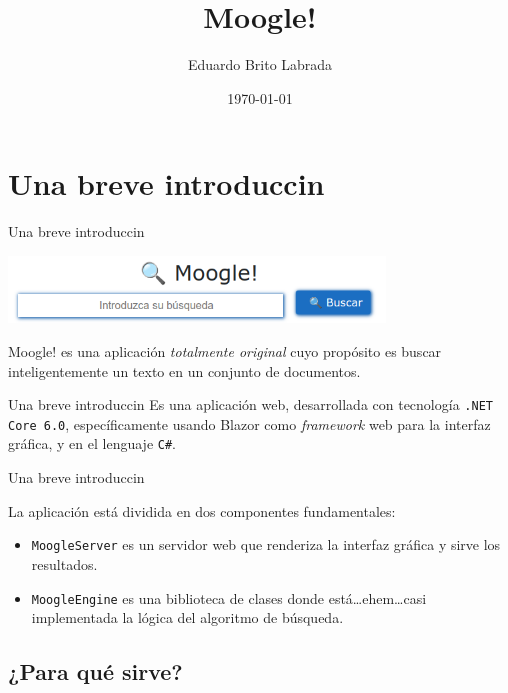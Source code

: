 \documentclass{beamer}
\title[Moogle!]{\LARGE Moogle!}
\author{Eduardo Brito Labrada}
\institute[Universidad de La Habana]
{
  Facultad de Matem\'atica y Computacin
}
\date{\today}
\begin{document}
\begin{frame}
  \maketitle
\end{frame}

\section{Una breve introduccin}

\begin{frame}{Una breve introduccin}
  \begin{center}
    \includegraphics[width=10cm]{images/moogle.png}
  \end{center}

  Moogle! es una aplicación {\em totalmente original} cuyo propósito es buscar
  inteligentemente un texto en un conjunto de documentos.
\end{frame}

\begin{frame}{Una breve introduccin}
  Es una aplicación web, desarrollada con tecnología {\tt .NET Core 6.0}, específicamente
  usando Blazor como {\it framework} web para la interfaz gráfica, y en el
  lenguaje {\tt C\#}. \\
\end{frame}

\begin{frame}{Una breve introduccin}

  La aplicación está dividida en dos componentes fundamentales:

  \begin{itemize}[<+->]
    \item {\tt MoogleServer} es un servidor web que renderiza la interfaz gráfica y sirve los resultados.
    \item {\tt MoogleEngine} es una biblioteca de clases donde está\dots ehem\dots casi implementada la lógica del algoritmo de búsqueda.
  \end{itemize}
\end{frame}

\subsection{¿Para qué sirve?}
\end{document}
